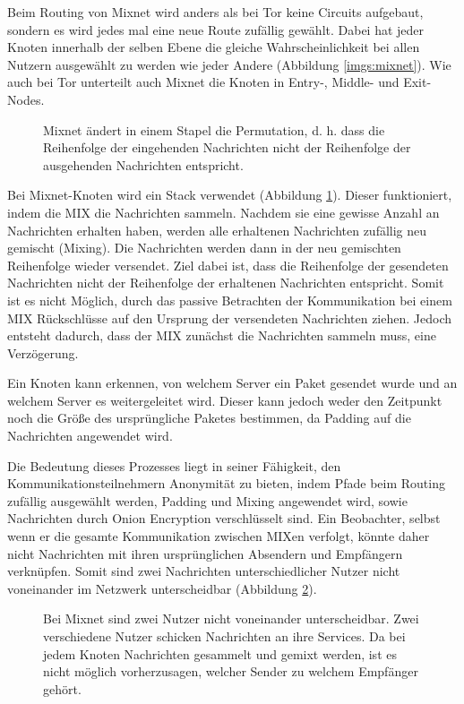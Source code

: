 Beim Routing von Mixnet wird anders als bei Tor keine Circuits aufgebaut, sondern es wird jedes mal eine neue Route zufällig gewählt. Dabei hat jeder Knoten innerhalb der selben Ebene die gleiche Wahrscheinlichkeit bei allen Nutzern ausgewählt zu werden wie jeder Andere (Abbildung \ref{imgs:mixnet}). Wie auch bei Tor unterteilt auch Mixnet die Knoten in Entry-, Middle- und Exit-Nodes.

\begin{figure}[h!]
    \centering
    
    \caption{Mixnet ändert in einem Stapel die Permutation, d. h. dass die Reihenfolge der eingehenden Nachrichten nicht der Reihenfolge der ausgehenden Nachrichten entspricht.}
    \label{imgs:mixnet_stack}
\end{figure}

Bei Mixnet-Knoten wird ein Stack verwendet (Abbildung \ref{imgs:mixnet_stack}). Dieser funktioniert, indem die MIX die Nachrichten sammeln. Nachdem sie eine gewisse Anzahl an Nachrichten erhalten haben, werden alle erhaltenen Nachrichten zufällig neu gemischt (Mixing). Die Nachrichten werden dann in der neu gemischten Reihenfolge wieder versendet. Ziel dabei ist, dass die Reihenfolge der gesendeten Nachrichten nicht der Reihenfolge der erhaltenen Nachrichten entspricht. Somit ist es nicht Möglich, durch das passive Betrachten der Kommunikation bei einem MIX Rückschlüsse auf den Ursprung der versendeten Nachrichten ziehen. Jedoch entsteht dadurch, dass der MIX zunächst die Nachrichten sammeln muss, eine Verzögerung.

Ein Knoten kann erkennen, von welchem Server ein Paket gesendet wurde und an welchem Server es weitergeleitet wird. Dieser kann jedoch weder den Zeitpunkt noch die Größe des ursprüngliche Paketes bestimmen, da Padding auf die Nachrichten angewendet wird.

Die Bedeutung dieses Prozesses liegt in seiner Fähigkeit, den Kommunikationsteilnehmern Anonymität zu bieten, indem Pfade beim Routing zufällig ausgewählt werden, Padding und Mixing angewendet wird, sowie Nachrichten durch Onion Encryption verschlüsselt sind. Ein Beobachter, selbst wenn er die gesamte Kommunikation zwischen MIXen verfolgt, könnte daher nicht Nachrichten mit ihren ursprünglichen Absendern und Empfängern verknüpfen. Somit sind zwei Nachrichten unterschiedlicher Nutzer nicht voneinander im Netzwerk unterscheidbar (Abbildung \ref{imgs:mixnet_transfer}).

\begin{figure}[ht!]
    \centering
    
    \caption{Bei Mixnet sind zwei Nutzer nicht voneinander unterscheidbar. Zwei verschiedene Nutzer schicken Nachrichten an ihre Services. Da bei jedem Knoten Nachrichten gesammelt und gemixt werden, ist es nicht möglich vorherzusagen, welcher Sender zu welchem Empfänger gehört.}
    \label{imgs:mixnet_transfer}
\end{figure}

